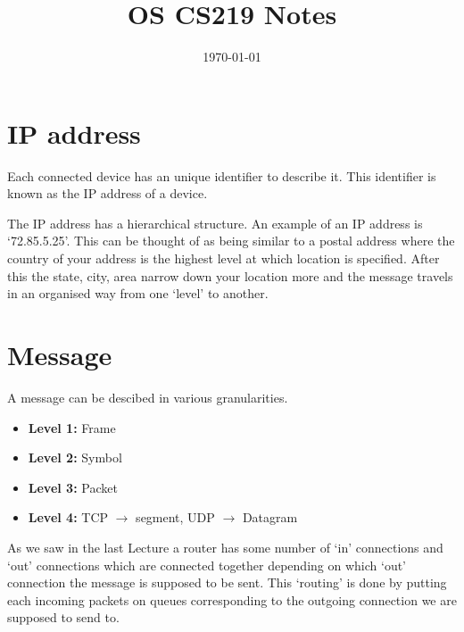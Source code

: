 \documentclass[12pt]{article}
\title{OS CS219 Notes}
\author{}
\date{\today}
\newcommand{\tbox}[1]{\noindent\fbox{\parbox{\textwidth}{#1}}}
\begin{document}
\maketitle
\setlength{\parskip}{6pt}
\setlength{\parindent}{0pt}

\noindent\tbox{
    \begin{center}
    \textbf{\Huge Lecture 1}
    \end{center}
}


\noindent\tbox{
    \begin{center}
    \textbf{\Huge Lecture 2}
    \end{center}
}


\section{IP address}

Each connected device has an unique identifier to describe it.
This identifier is known as the IP address of a device. 

The IP address has a hierarchical structure. An example of an IP address is `72.85.5.25'. This can be thought of 
as being similar to a postal address where the country of your address is the highest level at which location is specified. 
After this the state, city, area narrow down your location more and the message travels in an organised way from one `level' to another.


\section{Message}


A message can be descibed in various granularities.
\begin{itemize}
    \item \textbf{Level 1:} Frame
    \item \textbf{Level 2:} Symbol
    \item \textbf{Level 3:} Packet
    \item \textbf{Level 4:} TCP $\rightarrow$ segment, UDP $\rightarrow$ Datagram
\end{itemize}


As we saw in the last Lecture a router has some number of `in' connections and `out' connections which are connected together depending on which 
`out' connection the message is supposed to be sent. This  `routing' is done by putting each incoming packets on queues corresponding to the outgoing connection we 
are supposed to send to.
\end{document}
